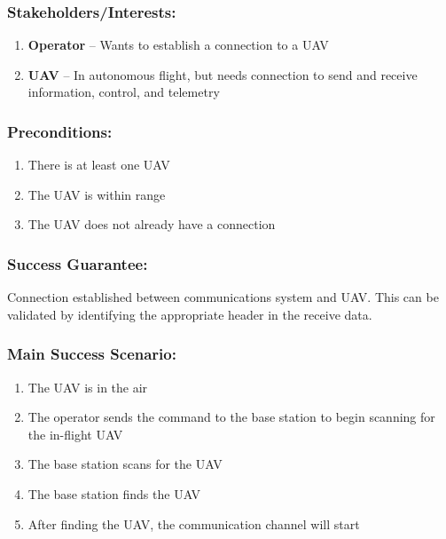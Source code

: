 \documentclass[ProductRequirements.tex]{subfiles}
\begin{document}
		\subsubsection*{Stakeholders/Interests:}
			\begin{enumerate}\itemsep1pt
				\item \textbf{Operator} -- Wants to establish a connection to a UAV
				\item \textbf{UAV} -- In autonomous flight, but needs connection to send and receive information, control, and telemetry
			\end{enumerate}
		\subsubsection*{Preconditions:}
			\begin{enumerate}\itemsep1pt
				\item There is at least one UAV
				\item The UAV is within range
				\item The UAV does not already have a connection
			\end{enumerate}
		\subsubsection*{Success Guarantee:}
			Connection established between communications system and UAV. This can be validated by identifying the appropriate header in the receive data. 
		\subsubsection*{Main Success Scenario:}
			\begin{enumerate}\itemsep1pt
				\item The UAV is in the air
				\item The operator sends the command to the base station to begin scanning for the in-flight UAV
				\item The base station scans for the UAV
				\item The base station finds the UAV
				\item After finding the UAV, the communication channel will start
			\end{enumerate}
\end{document}
